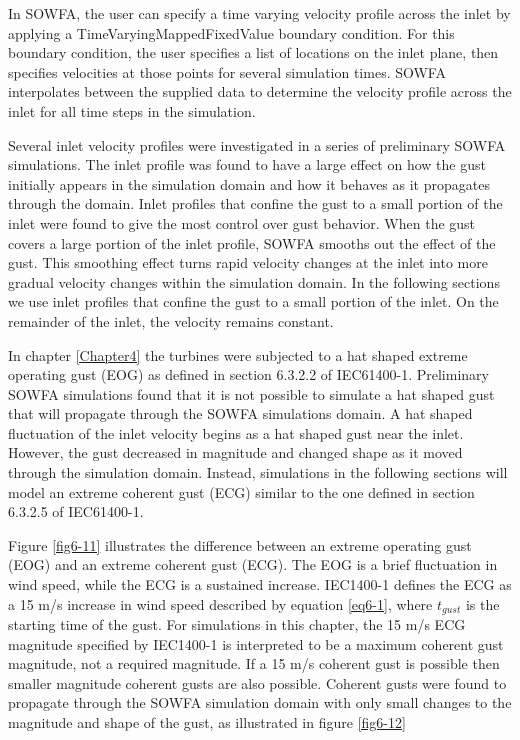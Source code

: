 In SOWFA, the user can specify a time varying velocity profile across the inlet by applying a TimeVaryingMappedFixedValue boundary condition. For this boundary condition, the user specifies a list of locations on the inlet plane, then specifies velocities at those points for several simulation times. SOWFA interpolates between the supplied data to determine the velocity profile across the inlet for all time steps in the simulation.

Several inlet velocity profiles were investigated in a series of preliminary SOWFA simulations. The inlet profile was found to have a large effect on how the gust initially appears in the simulation domain and how it behaves as it propagates through the domain. Inlet profiles that confine the gust to a small portion of the inlet were found to give the most control over gust behavior. When the gust covers a large portion of the inlet profile, SOWFA smooths out the effect of the gust. This smoothing effect turns rapid velocity changes at the inlet into more gradual velocity changes within the simulation domain. In the following sections we use inlet profiles that confine the gust to a small portion of the inlet. On the remainder of the inlet, the velocity remains constant. 

In chapter \ref{Chapter4} the turbines were subjected to a hat shaped extreme operating gust (EOG) as defined in section 6.3.2.2 of IEC61400-1\cite{IEC2005}. Preliminary SOWFA simulations found that it is not possible to simulate a hat shaped gust that will propagate through the SOWFA simulations domain. A hat shaped fluctuation of the inlet velocity begins as a hat shaped gust near the inlet. However, the gust decreased in magnitude and changed shape as it moved through the simulation domain. Instead, simulations in the following sections will model an extreme coherent gust (ECG) similar to the one defined in section 6.3.2.5 of IEC61400-1. 

Figure \ref{fig6-11} illustrates the difference between an extreme operating gust (EOG) and an extreme coherent gust (ECG). The EOG is a brief fluctuation in wind speed, while the ECG is a sustained increase. IEC1400-1 defines the ECG as a 15 m/s increase in wind speed described by equation \ref{eq6-1}, where $t_{gust}$ is the starting time of the gust. For simulations in this chapter, the 15 m/s ECG magnitude specified by IEC1400-1 is interpreted to be a maximum coherent gust magnitude, not a required magnitude. If a 15 m/s coherent gust is possible then smaller magnitude coherent gusts are also possible. Coherent gusts were found to propagate through the SOWFA simulation domain with only small changes to the magnitude and shape of the gust, as illustrated in figure \ref{fig6-12}



